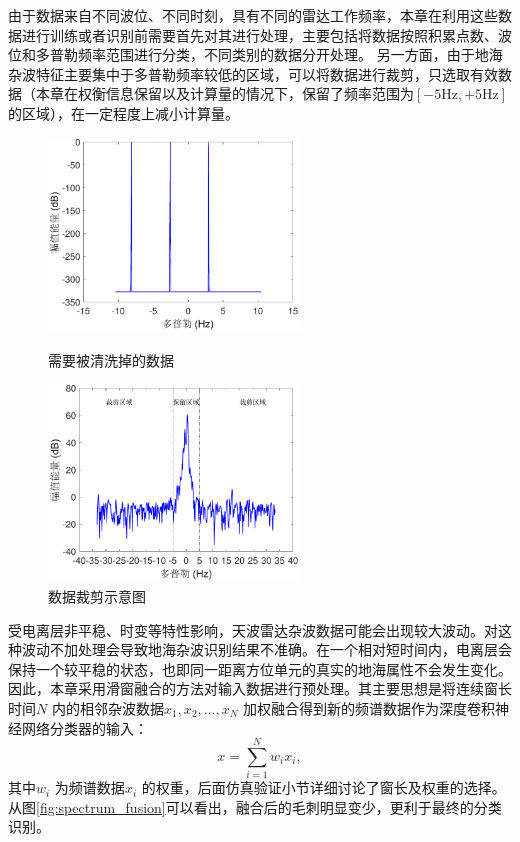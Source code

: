 由于数据来自不同波位、不同时刻，具有不同的雷达工作频率，本章在利用这些数据进行训练或者识别前需要首先对其进行处理，主要包括将数据按照积累点数、波位和多普勒频率范围进行分类，不同类别的数据分开处理。
另一方面，由于地海杂波特征主要集中于多普勒频率较低的区域，可以将数据进行裁剪，只选取有效数据（本章在权衡信息保留以及计算量的情况下，保留了频率范围为$[-5\text{Hz},+5\text{Hz}]$的区域），在一定程度上减小计算量。
\begin{figure}[hbt]
	\centering
	\begin{minipage}{7cm}
		\includegraphics[width=6.67cm]{figures/othr/delete}
		\caption{需要被清洗掉的数据}
		\label{fig:delete}

	\end{minipage}
	\hspace{10pt}
	\begin{minipage}{7cm}
		\includegraphics[width=6.67cm]{figures/othr/cut}
		\caption{数据裁剪示意图}
		\label{fig:cut}

	\end{minipage}

\end{figure}

受电离层非平稳、时变等特性影响，天波雷达杂波数据可能会出现较大波动。对这种波动不加处理会导致地海杂波识别结果不准确。在一个相对短时间内，电离层会保持一个较平稳的状态，也即同一距离方位单元的真实的地海属性不会发生变化。因此，本章采用滑窗融合的方法对输入数据进行预处理。其主要思想是将连续窗长时间$N$ 内的相邻杂波数据$x_1,x_2,\dots,x_N$ 加权融合得到新的频谱数据作为深度卷积神经网络分类器的输入：
\begin{equation}
	x=\sum_{i=1}^N w_ix_i,
	\label{equ:window_fusion}
\end{equation}
其中$w_i$ 为频谱数据$x_i$ 的权重，后面仿真验证小节详细讨论了窗长及权重的选择。从图\ref{fig:spectrum_fusion}可以看出，融合后的毛刺明显变少，更利于最终的分类识别。

